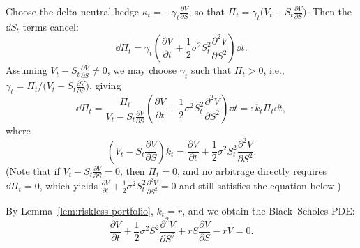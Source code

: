 Choose the delta-neutral hedge $\kappa_t = -\gamma_t \frac{\partial V}{\partial S}$, so that $\Pi_t = \gamma_t\bigl(V_t - S_t \frac{\partial V}{\partial S}\bigr)$. Then the $\dd S_t$ terms cancel:
\[
\dd \Pi_t = \gamma_t\left(\frac{\partial V}{\partial t} + \frac{1}{2}\sigma^2 S_t^2 \frac{\partial^2 V}{\partial S^2}\right)\dd t.
\]
Assuming $V_t - S_t \frac{\partial V}{\partial S} \neq 0$, we may choose $\gamma_t$ such that $\Pi_t > 0$, i.e., $\gamma_t = \Pi_t / \bigl(V_t - S_t \frac{\partial V}{\partial S}\bigr)$, giving
\[
\dd \Pi_t = \frac{\Pi_t}{V_t - S_t \frac{\partial V}{\partial S}} \left(\frac{\partial V}{\partial t} + \frac{1}{2}\sigma^2 S_t^2 \frac{\partial^2 V}{\partial S^2}\right)\dd t =: k_t \Pi_t\dd t,
\]
where
\[
\left(V_t - S_t \frac{\partial V}{\partial S}\right) k_t = \frac{\partial V}{\partial t} + \frac{1}{2}\sigma^2 S_t^2 \frac{\partial^2 V}{\partial S^2}.
\]
(Note that if $V_t - S_t \frac{\partial V}{\partial S} = 0$, then $\Pi_t = 0$, and no arbitrage directly requires $\dd \Pi_t = 0$, which yields $\frac{\partial V}{\partial t} + \frac{1}{2}\sigma^2 S_t^2 \frac{\partial^2 V}{\partial S^2} = 0$ and still satisfies the equation below.)

By Lemma~\ref{lem:riskless-portfolio}, $k_t = r$, and we obtain the Black--Scholes PDE:
\[
\frac{\partial V}{\partial t} + \frac{1}{2}\sigma^2 S^2 \frac{\partial^2 V}{\partial S^2} + r S \frac{\partial V}{\partial S} - r V = 0.
\]
